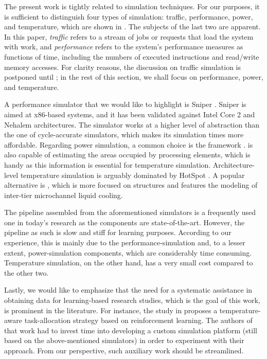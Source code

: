 The present work is tightly related to simulation techniques. For our purposes,
it is sufficient to distinguish four types of simulation: traffic, performance,
power, and temperature, which are shown in . The subjects of
the last two are apparent. In this paper, \emph{traffic} refers to a stream of
jobs or requests that load the system with work, and \emph{performance} refers
to the system's performance measures as functions of time, including the numbers
of executed instructions and read/write memory accesses. For clarity reasons,
the discussion on traffic simulation is postponed until ; in the
rest of this section, we shall focus on performance, power, and temperature.

A performance simulator that we would like to highlight is Sniper
\cite{carlson2011}. Sniper is aimed at x86-based systems, and it has been
validated against Intel Core 2 and Nehalem architectures. The simulator works at
a higher level of abstraction than the one of cycle-accurate simulators, which
makes its simulation times more affordable. Regarding power simulation, a common
choice is the  framework \cite{li2009}.  is also capable of
estimating the areas occupied by processing elements, which is handy as this
information is essential for temperature simulation. Architecture-level
temperature simulation is arguably dominated by HotSpot \cite{skadron2004}. A
popular alternative is  \cite{sridhar2010}, which is more focused on
 structures and features the modeling of inter-tier microchannel liquid
cooling.

The pipeline assembled from the aforementioned simulators is a frequently used
one in today's research as the components are state-of-the-art. However, the
pipeline as such is slow and stiff for learning purposes. According to our
experience, this is mainly due to the performance-simulation and, to a lesser
extent, power-simulation components, which are considerably time consuming.
Temperature simulation, on the other hand, has a very small cost compared to the
other two.

Lastly, we would like to emphasize that the need for a systematic assistance in
obtaining data for learning-based research studies, which is the goal of this
work, is prominent in the literature. For instance, the study in \cite{lu2015}
proposes a temperature-aware task-allocation strategy based on reinforcement
learning. The authors of that work had to invest time into developing a custom
simulation platform (still based on the above-mentioned simulators) in order to
experiment with their approach. From our perspective, such auxiliary work should
be streamlined.
